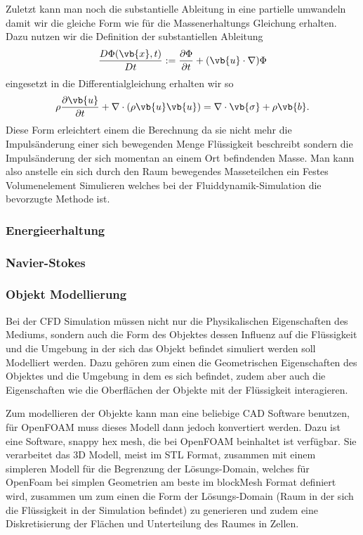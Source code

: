 Zuletzt kann man noch die substantielle Ableitung in eine partielle umwandeln damit wir die gleiche Form wie für die Massenerhaltungs Gleichung erhalten.
Dazu nutzen wir die Definition der substantiellen Ableitung
\[
\frac{D\Phi(\vb{x},t)}{Dt}
:=
\frac{\partial \Phi}{\partial t}+(\vb{u}\cdot \nabla)\Phi
\] 
eingesetzt in die Differentialgleichung erhalten wir so 
\[ \rho\frac{\partial\vb{u}}{\partial t} + \nabla \cdot(\rho\vb{u}\vb{u})
= 
\nabla \cdot \vb{\sigma} +\rho \vb{b}.
\]
Diese Form erleichtert einem die Berechnung da sie nicht mehr die Impulsänderung einer sich bewegenden Menge Flüssigkeit beschreibt sondern die Impulsänderung der sich momentan an einem Ort befindenden Masse. Man kann also anstelle ein sich durch den Raum bewegendes Masseteilchen ein Festes Volumenelement Simulieren welches bei der Fluiddynamik-Simulation die bevorzugte Methode ist.
\subsubsection{Energieerhaltung}
\subsubsection{Navier-Stokes}
\subsubsection{Objekt Modellierung}
Bei der CFD Simulation müssen nicht nur die Physikalischen Eigenschaften des Mediums, sondern auch die Form des Objektes dessen Influenz auf die Flüssigkeit und die Umgebung in der sich das Objekt befindet simuliert werden soll Modelliert werden.
Dazu gehören zum einen die Geometrischen Eigenschaften des Objektes und die Umgebung in dem es sich befindet, zudem aber auch die Eigenschaften wie die Oberflächen der Objekte mit der Flüssigkeit interagieren.

Zum modellieren der Objekte kann man eine beliebige CAD Software benutzen, für OpenFOAM muss dieses Modell dann jedoch konvertiert werden.
Dazu ist eine Software, snappy hex  mesh, die bei OpenFOAM beinhaltet ist verfügbar.
Sie verarbeitet das 3D Modell, meist im STL Format, zusammen mit einem simpleren Modell für die Begrenzung der Lösungs-Domain, welches für OpenFoam bei simplen Geometrien am beste im blockMesh Format definiert wird, zusammen um zum einen die Form der Lösungs-Domain (Raum in der sich die Flüssigkeit in der Simulation befindet) zu generieren und zudem eine Diskretisierung der Flächen und Unterteilung des Raumes in Zellen.




